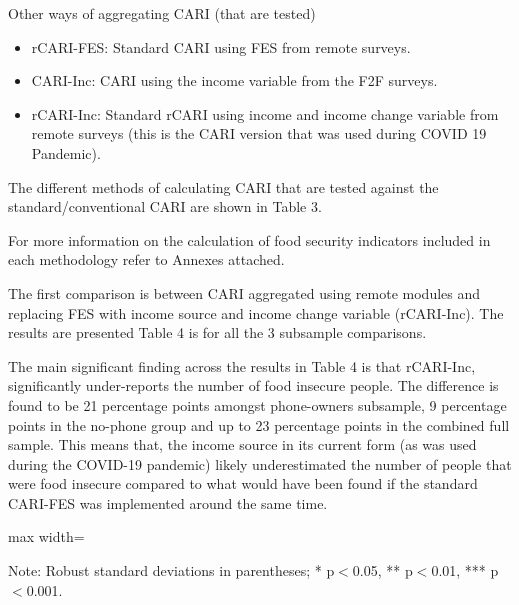 \documentclass[11pt,harvard]{article}
\begin{document}
	Other ways of aggregating CARI (that are tested)
	\begin{itemize}[label=--, left=1.5em]
		\item rCARI-FES: Standard CARI using FES from remote surveys.
		\item CARI-Inc: CARI using the income variable from the F2F surveys.
		\item rCARI-Inc: Standard rCARI using income and income change variable from remote surveys (this is the CARI version that was used during COVID 19 Pandemic).
	\end{itemize}
	
	The different methods of calculating CARI that are tested against the standard/conventional CARI are shown in Table 3. 
	
	
	For more information on the calculation of food security indicators included in each methodology refer to Annexes attached. 
	
	The first comparison is between CARI aggregated using remote modules and replacing FES with income source and income change variable (rCARI-Inc). The results are presented Table 4 is for all the 3 subsample comparisons.
	
	The main significant finding across the results in Table 4 is that rCARI-Inc, significantly under-reports the number of food insecure people. The difference is found to be 21 percentage points amongst phone-owners subsample, 9 percentage points in the no-phone group and up to 23 percentage points in the combined full sample. This means that, the income source in its current form (as was used during the COVID-19 pandemic) likely underestimated the number of people that were food insecure compared to what would have been found if the standard CARI-FES was implemented around the same time.
	
	\begin{table}[htbp]
		\centering
		\begin{adjustbox}{max width=\textwidth}
			\begin{threeparttable}
				\caption{Impact of Survey Modality: Standard CARI-FES vs. Standard rCARI-Inc}
				\scriptsize
				 
				\label{tab:CARI_rCARI_Modality_BF}
				\begin{tablenotes}
					\item Note: Robust standard deviations in parentheses; * p$<$0.05, ** p$<$0.01, *** p$<$0.001. 
				\end{tablenotes}
			\end{threeparttable}
		\end{adjustbox}
	\end{table}
	
\end{document}
